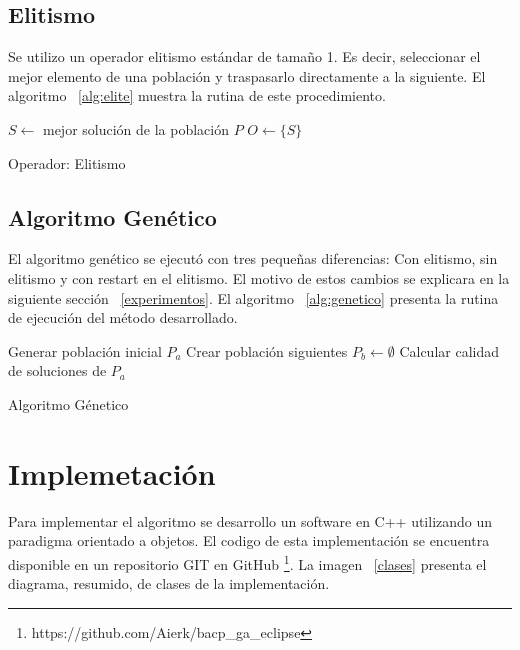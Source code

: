 \documentclass[letter, 10pt]{article}
\begin{document}
\subsection{Elitismo}
Se utilizo un operador elitismo estándar de tamaño 1. Es decir, seleccionar el
mejor elemento de una población y traspasarlo directamente a la siguiente.  El
algoritmo ~\ref{alg:elite} muestra la rutina de este procedimiento.

\begin{algorithm}[H]
\SetLine
{}

$S \gets$ mejor solución de la población $P$ \;
$O \gets \{S\}$ \;

\caption{Operador: Elitismo}
\label{alg:elite}
\end{algorithm}

\subsection{Algoritmo Genético}
El algoritmo genético se ejecutó con tres pequeñas diferencias: Con elitismo,
sin elitismo y con restart en el elitismo.  El motivo de estos cambios se
explicara en la siguiente sección ~\ref{experimentos}. El algoritmo
~\ref{alg:genetico} presenta la rutina de ejecución del método desarrollado.

\begin{algorithm}[H]
\SetLine
{}

Generar población inicial $P_{a}$ \;
Crear población siguientes $P_{b} \gets \emptyset$ \;
Calcular calidad de soluciones de $P_{a}$ \;
\caption{Algoritmo Génetico}
\label{alg:genetico}
\end{algorithm}

\section{Implemetación}
Para implementar el algoritmo se desarrollo un software en C++ utilizando un
paradigma orientado a objetos. El codigo de esta implementación se encuentra
disponible en un repositorio GIT en
GitHub \footnote{https://github.com/Aierk/bacp\_ga\_eclipse}. La imagen
~\ref{clases} presenta el diagrama, resumido, de clases de la implementación.
\end{document}

